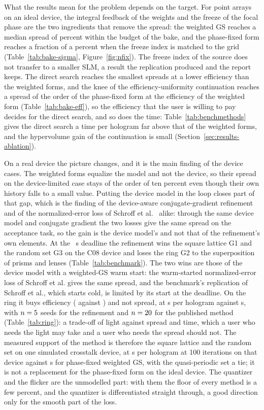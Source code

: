 What the results mean for the problem depends on the target. For point arrays on an ideal device, the integral feedback of the weights and the freeze of the focal phase are the two ingredients that remove the spread: the weighted GS reaches a median spread of  percent within the budget of the bake, and the phase-fixed form reaches a fraction of a percent when the freeze index is matched to the grid (Table~\ref{tab:bake-sigma}, Figure~\ref{fig:nfix}). The freeze index of the source does not transfer to a smaller SLM, a result the replication produced and the report keeps. The direct search reaches the smallest spreads at a lower efficiency than the weighted forms, and the knee of the efficiency-uniformity continuation reaches a spread of the order of the phase-fixed form at the efficiency of the weighted form (Table~\ref{tab:bake-eff}), so the efficiency that the user is willing to pay decides for the direct search, and so does the time: Table~\ref{tab:benchmethods} gives the direct search a time per hologram far above that of the weighted forms, and the hypervolume gain of the continuation is small (Section~\ref{sec:results-ablation}).

On a real device the picture changes, and it is the main finding of the device cases. The weighted forms equalize the model and not the device, so their spread on the device-limited case stays of the order of ten percent even though their own history falls to a small value. Putting the device model in the loop closes part of that gap, which is the finding of the device-aware conjugate-gradient refinement and of the normalized-error loss of Schroff et al.~\cite{schroff} alike: through the same device model and conjugate gradient the two losses give the same spread on the acceptance task, so the gain is the device model's and not that of the refinement's own elements. At the \dlReadS{}~s deadline the refinement wins the square lattice G1 and the random set G3 on the C08 device and loses the ring G2 to the superposition of prisms and lenses (Table~\ref{tab:benchmark}). The two wins are those of the device model with a weighted-GS warm start: the warm-started normalized-error loss of Schroff et al. gives the same spread, and the benchmark's replication of Schroff et al., which starts cold, is limited by its start at the deadline. On the ring it buys efficiency (\ringTimeBOneEff{} against \ringTimePubEff{}) and not spread, at \ringTimeBOneSec{} s per hologram against \ringTimePubSec{} s, with $n=5{}$ seeds for the refinement and $n=20{}$ for the published method (Table~\ref{tab:ring}): a trade-off of light against spread and time, which a user who needs the light may take and a user who needs the spread should not. The measured support of the method is therefore the square lattice and the random set on one simulated crosstalk device, at \benchSecDeviceBOne{} s per hologram at 100 iterations on that device against \benchSecDevicePF{} s for phase-fixed weighted GS, with the quasi-periodic set a tie; it is not a replacement for the phase-fixed form on the ideal device. The quantizer and the flicker are the unmodelled part: with them the floor of every method is a few percent, and the quantizer is differentiated straight through, a good direction only for the smooth part of the loss.

